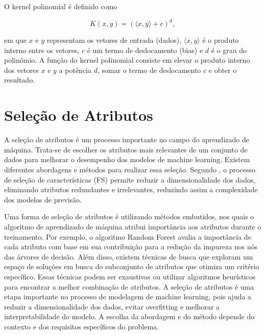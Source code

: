 \documentclass[12pt,oneside,a4paper,chapter=TITLE,
			   english,brazil]{abntex2}
\begin{document}
O kernel polinomial é definido como


\begin{equation}
    K(x, y) = (\langle x, y \rangle + c)^d,
\end{equation}


\noindent em que $x$ e $y$ representam os vetores de entrada (dados), $\langle x, y \rangle$ é o produto interno entre os vetores, $c$ é um termo de deslocamento (bias) e $d$ é o grau do polinômio. A função do kernel polinomial consiste em elevar o produto interno dos vetores $x$ e $y$ a potência $d$, somar o termo de deslocamento $c$ e obter o resultado.



\vspace{\onelineskip}
\section{Seleção de Atributos}
\vspace{\onelineskip}

A seleção de atributos é um processo importante no campo do aprendizado de máquina. Trata-se de escolher os atributos mais relevantes de um conjunto de dados para melhorar o desempenho dos modelos de machine learning. Existem diferentes abordagens e métodos para realizar essa seleção. Segundo ,  o processo de seleção de características (FS)  permite reduzir a dimensionalidade dos dados, eliminando atributos redundantes e irrelevantes, reduzindo assim a complexidade dos modelos de previsão.

Uma forma de seleção de atributos é utilizando métodos embutidos, nos quais o algoritmo de aprendizado de máquina atribui importância aos atributos durante o treinamento. Por exemplo, o algoritmo Random Forest avalia a importância de cada atributo com base em sua contribuição para a redução da impureza nos nós das árvores de decisão. Além disso, existem técnicas de busca que exploram um espaço de soluções em busca do subconjunto de atributos que otimiza um critério específico. Essas técnicas podem ser exaustivas ou utilizar algoritmos heurísticos para encontrar a melhor combinação de atributos. A seleção de atributos é uma etapa importante no processo de modelagem de machine learning, pois ajuda a reduzir a dimensionalidade dos dados, evitar overfitting e melhorar a interpretabilidade do modelo. A escolha da abordagem e do método depende do contexto e dos requisitos específicos do problema.
\end{document}
